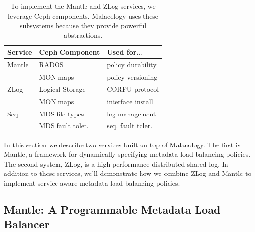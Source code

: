 \documentclass[10pt,twocolumn]{article}
\begin{document}
\begin{table}
\centering
\begin{tabular}{  l | l | l    }
\textbf{Service} & \textbf{Ceph Component} & \textbf{Used for...}  \\ \hline
Mantle  & RADOS    & policy durability \\
        & MON maps & policy versioning \\ \hline
ZLog    & Logical Storage & CORFU protocol  \\ 
        & MON maps & interface install \\ \hline
Seq.    & MDS file types & log management \\ 
        & MDS fault toler. & seq. fault toler. \\
\end{tabular}
\caption{To implement the Mantle and ZLog services, we leverage Ceph components. Malacology uses these subsystems because they provide powerful abstractions.}
\label{table:implementation}
\end{table}



In this section we describe two services built on top of Malacology. The first
is Mantle, a framework for dynamically specifying metadata load balancing
policies. The second system, ZLog, is a high-performance distributed shared-log.
In addition to these services, we'll demonstrate how we combine ZLog and Mantle
to implement service-aware metadata load balancing policies.

\subsection{Mantle: A Programmable Metadata Load Balancer}
\end{document}
